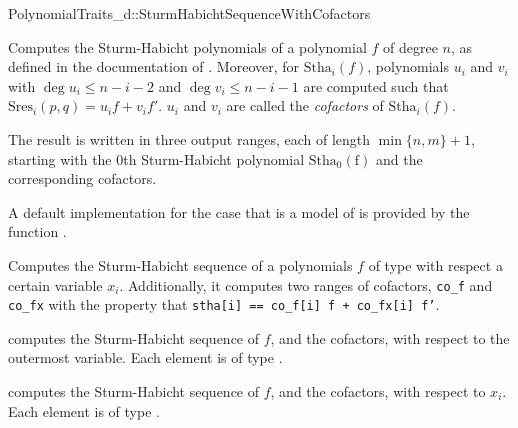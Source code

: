 \begin{ccRefConcept}{PolynomialTraits_d::SturmHabichtSequenceWithCofactors}
\ccDefinition

Computes the Sturm-Habicht polynomials of a polynomial $f$ of degree $n$, 
as defined in the documentation of .
Moreover, for $\mathrm{Stha}_i(f)$, polynomials $u_i$ and $v_i$
with $\deg u_i\leq n-i-2$ and $\deg v_i\leq n-i-1$ are computed 
such that $\mathrm{Sres}_i(p,q)=u_i f + v_i f'$. $u_i$ and $v_i$ are called
the \emph{cofactors} of $\mathrm{Stha}_i(f)$.
 
The result is written in three output ranges, each of length $\min\{n,m\}+1$, 
starting with the $0$th Sturm-Habicht polynomial $\mathrm{Stha_0(f)}$ 
and the corresponding cofactors.

A default implementation for the case that 
is a model of 
is provided by the function .

Computes the Sturm-Habicht sequence of a polynomials $f$ of type 
 with respect a certain variable $x_i$.
Additionally, it computes two ranges of cofactors, {\tt co\_f} and {\tt co\_fx}
with the property that {\tt stha[i] == co\_f[i] f + co\_fx[i] f'}.

\ccOperations
{}
         { computes the Sturm-Habicht sequence of $f$, and the cofactors, 
           with respect to the outermost variable. Each element is of type
           .}

         { computes the Sturm-Habicht sequence of $f$, and the cofactors, 
           with respect to $x_i$. Each element is of type
           .}


\ccSeeAlso

\\
\\
\\
\\

\end{ccRefConcept}
